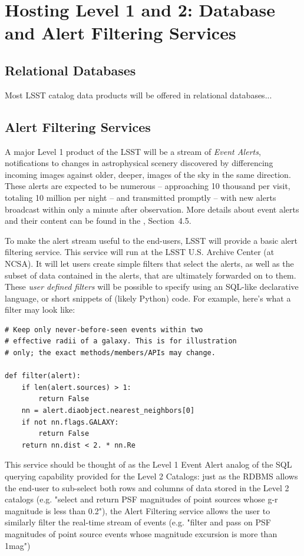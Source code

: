 \documentclass[DM,lsstdraft,toc]{lsstdoc}
\begin{document}
\section{Hosting Level 1 and 2: Database and Alert Filtering Services}

\subsection{Relational Databases}

Most LSST catalog data products will be offered in relational databases...

\subsection{Alert Filtering Services}

A major Level 1 product of the LSST will be a stream of {\em Event Alerts}, notifications to changes in astrophysical scenery discovered by differencing incoming images against older, deeper, images of the sky in the same direction. These alerts are expected to be numerous --  approaching 10 thousand per visit, totaling 10 million per night -- and transmitted promptly -- with new alerts broadcast within only a minute after observation. More details about event alerts and their content can be found in the \DPDD, Section~4.5.

To make the alert stream useful to the end-users, LSST will provide a basic alert filtering service. This service will run at the LSST U.S. Archive Center (at NCSA). It will let users create simple filters that select the alerts, as well as the subset of data contained in the alerts, that are ultimately forwarded on to them. These {\em user defined filters} will be possible to specify using an SQL-like declarative language, or short snippets of (likely Python) code. For example, here's what a filter may look like:
\begin{verbatim}
# Keep only never-before-seen events within two
# effective radii of a galaxy. This is for illustration
# only; the exact methods/members/APIs may change.

def filter(alert):
	if len(alert.sources) > 1:
		return False
	nn = alert.diaobject.nearest_neighbors[0]
	if not nn.flags.GALAXY:
		return False
	return nn.dist < 2. * nn.Re
\end{verbatim}

This service should be thought of as the Level 1 Event Alert analog of the SQL querying capability provided for the Level 2 Catalogs: just as the RDBMS allows the end-user to sub-select both rows and columns of data stored in the Level 2 catalogs (e.g. "select and return PSF magnitudes of point sources whose g-r magnitude is less than 0.2"), the Alert Filtering service allows the user to similarly filter the real-time stream of events (e.g. "filter and pass on PSF magnitudes of point source events whose magnitude excursion is more than 1mag")
\end{document}
